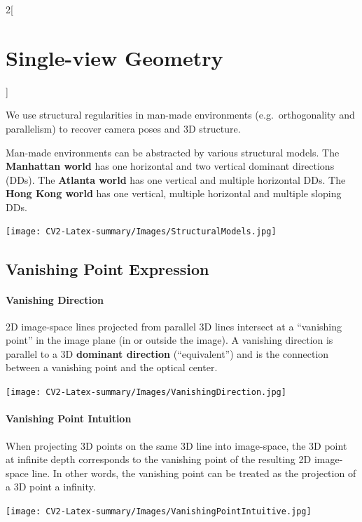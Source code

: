 \documentclass[oneside,fontsize=11pt,paper=a4]{scrartcl}
\begin{document}



\begin{multicols}{2}[\section{Single-view Geometry}]

We use structural regularities in man-made environments (e.g.\ orthogonality and parallelism) to recover camera poses and 3D structure.

Man-made environments can be abstracted by various structural models. The \textbf{Manhattan world} has one horizontal and two vertical dominant directions (DDs). The \textbf{Atlanta world} has one vertical and multiple horizontal DDs. The \textbf{Hong Kong world} has one vertical, multiple horizontal and multiple sloping DDs.
\begin{center}
    \texttt{[image: CV2-Latex-summary/Images/StructuralModels.jpg]}
\end{center}

\subsection{Vanishing Point Expression}

\paragraph{Vanishing Direction} 2D image-space lines projected from parallel 3D lines intersect at a ``vanishing point'' in the image plane (in or outside the image). A vanishing direction is parallel to a 3D \textbf{dominant direction} (``equivalent'') and is the connection between a vanishing point and the optical center.
\begin{center}
    \texttt{[image: CV2-Latex-summary/Images/VanishingDirection.jpg]}
\end{center} 
\paragraph{Vanishing Point Intuition} When projecting 3D points on the same 3D line into image-space, the 3D point at infinite depth corresponds to the vanishing point of the resulting 2D image-space line. In other words, the vanishing point can be treated as the projection of a 3D point a infinity.
\begin{center}
    \texttt{[image: CV2-Latex-summary/Images/VanishingPointIntuitive.jpg]}
\end{center}


\end{multicols}
\end{document}
